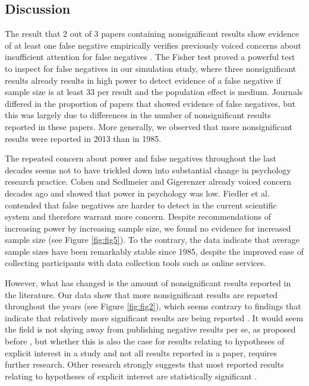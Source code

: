 \documentclass{article}
\begin{document}
\subsection*{Discussion}

The result that 2 out of 3 papers containing nonsignificant results show evidence of at least one false negative empirically verifies previously voiced concerns about insufficient attention for false negatives \cite{Fiedler2012-gx}. The Fisher test proved a powerful test to inspect for false negatives in our simulation study, where three nonsignificant results already results in high power to detect evidence of a false negative if sample size is at least 33 per result and the population effect is medium. Journals differed in the proportion of papers that showed evidence of false negatives, but this was largely due to differences in the number of nonsignificant results reported in these papers. More generally, we observed that more nonsignificant results were reported in 2013 than in 1985. 

The repeated concern about power and false negatives throughout the last decades seems not to have trickled down into substantial change in psychology research practice. Cohen \cite{Cohen1962-jc} and Sedlmeier and Gigerenzer \cite{Sedlmeier1989-yc} already voiced concern decades ago and showed that power in psychology was low. Fiedler et al. \cite{Fiedler2012-gx} contended that false negatives are harder to detect in the current scientific system and therefore warrant more concern. Despite recommendations of increasing power by increasing sample size, we found no evidence for increased sample size (see Figure \ref{fig:fig5}). To the contrary, the data indicate that average sample sizes have been remarkably stable since 1985, despite the improved ease of collecting participants with data collection tools such as online services.

However, what has changed is the amount of nonsignificant results reported in the literature. Our data show that more nonsignificant results are reported throughout the years (see Figure \ref{fig:fig2}), which seems contrary to findings that indicate that relatively more significant results are being reported \cite{Fanelli2011-xa, Sterling1995-fe, Sterling1959-pf,De_Winter2015-ru}. It would seem the field is not shying away from publishing negative results per se, as proposed before \cite{Fanelli2011-xa,Greenwald1975-ck,Nosek2012-aw,Rosenthal1979-lx,Schimmack2012-du}, but whether this is also the case for results relating to hypotheses of explicit interest in a study and not all results reported in a paper, requires further research. Other research strongly suggests that most reported results relating to hypotheses of explicit interest are statistically significant \cite{Open_Science_Collaboration2015-zs}.
\end{document}
